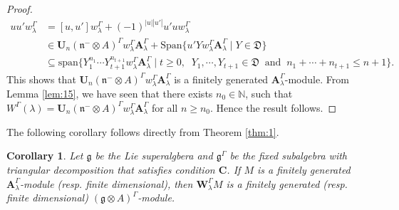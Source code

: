 \documentclass[11pt]{amsart}
\theoremstyle{plain}
\newtheorem{cor}[thm]{Corollary}
\theoremstyle{definition}
\newcommand{\g}{\mathfrak{g}}
\newcommand{\n}{\mathfrak{n}}
\newcommand{\A}{\mathbf{A}_{\lambda}^{\Gamma}}
\newcommand{\w}{w_{\lambda}^{\Gamma}}
\begin{document}
\begin{proof}
\begin{align*}
uu'\w &=[u,u']\w+(-1)^{{|u|}{|u'|}}u'u\w \\
&\in\mathbf{U}_{n}(\n^{-}\otimes A)^{\Gamma}\w\A+\mbox{Span}\{u'Y\w\A\mid  Y\in\mathfrak{D}\} \\
&\subseteq\mathrm{span}\{Y_{1}^{n_1}\cdots Y_{t+1}^{n_{t+1}}\w\A\mid t\geq 0,\;\; Y_{1},\cdots,Y_{t+1}\in \mathfrak{D}\;\;\mbox{and}\;\; n_{1}+\cdots+n_{t+1}\leq n+1\}.
\end{align*}
This shows that $\mathbf{U}_n(\n^{-}\otimes A)^{\Gamma}\w\A$ is a finitely generated $\A$-module. From Lemma \ref{lem:15}, we have seen that there exists $n_{0}\in\mathbb{N}$, such that $W^{\Gamma}(\lambda)=\mathbf{U}_{n}(\n^{-}\otimes A)^{\Gamma}\w\A$ for all $n\geq n_{0}$. Hence the result follows.
\end{proof}
The following corollary follows directly from Theorem \ref{thm:1}.
\begin{cor}\label{cor:7.9}
Let $\g$ be the Lie superalgbera and $\g^{\Gamma}$ be the fixed subalgebra with triangular decomposition that satisfies condition $\mathbf{C}$. If $M$ is a finitely generated $\A$-module (resp. finite dimensional), then $\mathbf{W}_{\lambda}^{\Gamma}M$ is a finitely generated (resp. finite dimensional) $(\g\otimes A)^{\Gamma}$-module.
\end{cor}
\end{document}
